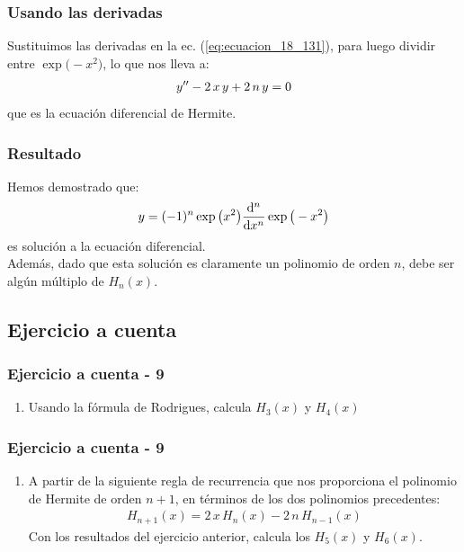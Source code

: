 \documentclass[12pt]{beamer}
\begin{document}
\begin{frame}
\frametitle{Usando las derivadas}
Sustituimos las derivadas en la ec. (\ref{eq:ecuacion_18_131}), para luego dividir entre $\exp\big( - x^{2} \big)$, lo que nos lleva a:
\pause
\begin{align*}
{y}^{\prime \prime} - 2 \, x \, y + 2 \, n \, y = 0
\end{align*}
\pause
que es la ecuación diferencial de Hermite.
\end{frame}
\begin{frame}
\frametitle{Resultado}
Hemos demostrado que:
\pause
\begin{align*}
y = (-1)^{n} \exp\big( x^{2} \big) \dv[n]{x} \exp\big( - x^{2} \big)
\end{align*}
es solución a la ecuación diferencial.
\\
\bigskip
\pause
Además, dado que esta solución es claramente un polinomio de orden $n$, debe ser algún múltiplo de $H_{n} (x)$.
\end{frame}

\subsection{Ejercicio a cuenta}

\begin{frame}
\frametitle{Ejercicio a cuenta - 9}
\begin{enumerate}
\item Usando la fórmula de Rodrigues, calcula $H_{3} (x)$ y $H_{4} (x)$
\seti
\end{enumerate}
\end{frame}
\begin{frame}
\frametitle{Ejercicio a cuenta - 9}
\begin{enumerate}
\conti
\item A partir de la siguiente regla de recurrencia que nos proporciona el polinomio de Hermite de orden $n + 1$, en términos de los dos polinomios precedentes:
\pause
\begin{align*}
H_{n+1} (x) = 2 \, x \, H_{n} (x) - 2 \, n \, H_{n - 1} (x)
\end{align*}
Con los resultados del ejercicio anterior, calcula los $H_{5} (x)$ y $H_{6} (x)$.
\end{enumerate}
\end{frame}
\end{document}

